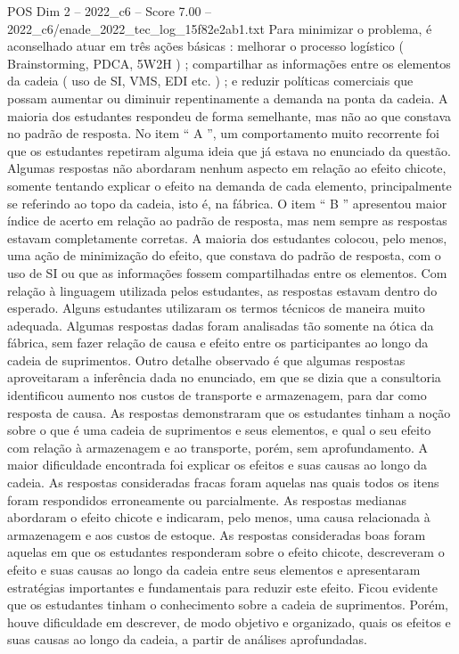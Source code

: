 \begin{textsample}{POS Dim 2 – 2022\_c6 – Score 7.00 – 2022\_c6/enade\_2022\_tec\_log\_15f82e2ab1.txt}
Para minimizar o problema, é aconselhado atuar em três ações básicas : melhorar o processo logístico ( Brainstorming, PDCA, 5W2H ) ; compartilhar as informações entre os elementos da cadeia ( uso de SI, VMS, EDI etc. ) ; e reduzir políticas comerciais que possam aumentar ou diminuir repentinamente a demanda na ponta da cadeia.
A maioria dos estudantes respondeu de forma semelhante, mas não ao que constava no padrão de resposta.
No item “ A ”, um comportamento muito recorrente foi que os estudantes repetiram alguma ideia que já estava no enunciado da questão.
Algumas respostas não abordaram nenhum aspecto em relação ao efeito chicote, somente tentando explicar o efeito na demanda de cada elemento, principalmente se referindo ao topo da cadeia, isto é, na fábrica.
O item “ B ” apresentou maior índice de acerto em relação ao padrão de resposta, mas nem sempre as respostas estavam completamente corretas.
A maioria dos estudantes colocou, pelo menos, uma ação de minimização do efeito, que constava do padrão de resposta, com o uso de SI ou que as informações fossem compartilhadas entre os elementos.
Com relação à linguagem utilizada pelos estudantes, as respostas estavam dentro do esperado.
Alguns estudantes utilizaram os termos técnicos de maneira muito adequada.
Algumas respostas dadas foram analisadas tão somente na ótica da fábrica, sem fazer relação de causa e efeito entre os participantes ao longo da cadeia de suprimentos.
Outro detalhe observado é que algumas respostas aproveitaram a inferência dada no enunciado, em que se dizia que a consultoria identificou aumento nos custos de transporte e armazenagem, para dar como resposta de causa.
As respostas demonstraram que os estudantes tinham a noção sobre o que é uma cadeia de suprimentos e seus elementos, e qual o seu efeito com relação à armazenagem e ao transporte, porém, sem aprofundamento.
A maior dificuldade encontrada foi explicar os efeitos e suas causas ao longo da cadeia.
As respostas consideradas fracas foram aquelas nas quais todos os itens foram respondidos erroneamente ou parcialmente.
As respostas medianas abordaram o efeito chicote e indicaram, pelo menos, uma causa relacionada à armazenagem e aos custos de estoque.
As respostas consideradas boas foram aquelas em que os estudantes responderam sobre o efeito chicote, descreveram o efeito e suas causas ao longo da cadeia entre seus elementos e apresentaram estratégias importantes e fundamentais para reduzir este efeito.
Ficou evidente que os estudantes tinham o conhecimento sobre a cadeia de suprimentos.
Porém, houve dificuldade em descrever, de modo objetivo e organizado, quais os efeitos e suas causas ao longo da cadeia, a partir de análises aprofundadas.

\end{textsample}
